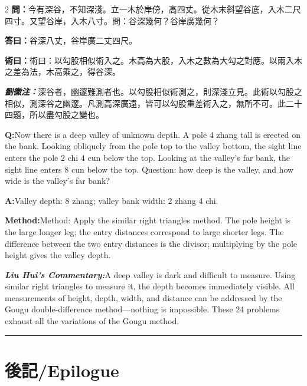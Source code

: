 \documentclass[11pt,a4paper]{article}
\newcommand{\cnwen}{\textcolor{cnlabelfg}{\textbf{問：}}}
\newcommand{\cnda}{\textbf{答曰：}}
\newcommand{\cnshu}{\textcolor{cnlabelfg}{\textbf{術曰：}}}
\newcommand{\cnzhu}{\textcolor{commentarycolor}{\textit{\textbf{劉徽注：}}}}
\newcommand{\enwen}{\textcolor{enlabelfg}{\textbf{Q:}}}
\newcommand{\enda}{\textcolor{enlabelfg}{\textbf{A:}}}
\newcommand{\enshu}{\textcolor{enlabelfg}{\textbf{Method:}}}
\newcommand{\enzhu}{\textcolor{enlabelfg}{\textit{\textbf{Liu Hui's Commentary:}}}}
\begin{document}
\begin{paracol}{2}
\switchcolumn[0]
\cnwen 今有深谷，不知深淺。立一木於岸傍，高四丈。從木末斜望谷底，入木二尺四寸。又望谷岸，入木八寸。問：谷深幾何？谷岸廣幾何？

\cnda 谷深八丈，谷岸廣二丈四尺。

\cnshu 術曰：以勾股相似術入之。木高為大股，入木之數為大勾之對應。以兩入木之差為法，木高乘之，得谷深。

\cnzhu 深谷者，幽邃難測者也。以勾股相似術測之，則深淺立見。此術以勾股之相似，測深谷之幽邃。凡測高深廣遠，皆可以勾股重差術入之，無所不可。此二十四題，所以盡勾股之變也。

\switchcolumn[1]
\enwen Now there is a deep valley of unknown depth. A pole 4 zhang tall is erected on the bank. Looking obliquely from the pole top to the valley bottom, the sight line enters the pole 2 chi 4 cun below the top. Looking at the valley's far bank, the sight line enters 8 cun below the top. Question: how deep is the valley, and how wide is the valley's far bank?

\enda Valley depth: 8 zhang; valley bank width: 2 zhang 4 chi.

\enshu Method: Apply the similar right triangles method. The pole height is the large longer leg; the entry distances correspond to large shorter legs. The difference between the two entry distances is the divisor; multiplying by the pole height gives the valley depth.

\enzhu A deep valley is dark and difficult to measure. Using similar right triangles to measure it, the depth becomes immediately visible. All measurements of height, depth, width, and distance can be addressed by the Gougu double-difference method---nothing is impossible. These 24 problems exhaust all the variations of the Gougu method.
\end{paracol}

\bigskip\hrule\bigskip

\newpage
\section*{後記\quad /\quad Epilogue}
\end{document}
